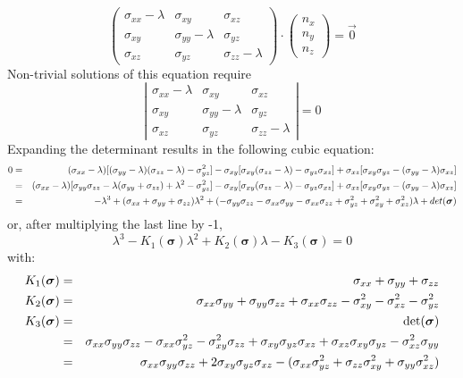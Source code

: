 \[
\left(
\begin{array}{ccc}
\sigma_{xx}-\lambda & \sigma_{xy} & \sigma_{xz} \\
\sigma_{xy} & \sigma_{yy}-\lambda & \sigma_{yz} \\
\sigma_{xz} & \sigma_{yz} & \sigma_{zz} -\lambda
\end{array}
\right)
\cdot
\left(
\begin{array}{c}
n_x \\ n_y \\ n_z
\end{array}
\right)
= \vec{0}
\]
Non-trivial solutions of this equation require 
\[
\left|  
\begin{array}{ccc}
\sigma_{xx}-\lambda & \sigma_{xy} & \sigma_{xz} \\
\sigma_{xy} & \sigma_{yy}-\lambda & \sigma_{yz} \\
\sigma_{xz} & \sigma_{yz} & \sigma_{zz} -\lambda
\end{array}
\right|
=0
\]
Expanding the determinant results in the following cubic equation:
\begin{eqnarray}
0 
&=&
(\sigma_{xx}-\lambda) [ ( \sigma_{yy}-\lambda )( \sigma_{zz} -\lambda)- \sigma_{yz}^2]
- \sigma_{xy} [ \sigma_{xy} ( \sigma_{zz} -\lambda) - \sigma_{yz} \sigma_{xz} ] 
+ \sigma_{xz} [ \sigma_{xy}  \sigma_{yz} - (\sigma_{yy}-\lambda )  \sigma_{xz} ]  \nonumber\\
&=& (\sigma_{xx}-\lambda) [ \sigma_{yy}\sigma_{zz} -\lambda (\sigma_{yy}+ \sigma_{zz})+ \lambda ^2- \sigma_{yz}^2]
- \sigma_{xy} [ \sigma_{xy} ( \sigma_{zz} -\lambda) - \sigma_{yz} \sigma_{xz} ] 
+ \sigma_{xz} [ \sigma_{xy}  \sigma_{yz} - (\sigma_{yy}-\lambda )  \sigma_{xz} ] \nonumber\\
&=& -\lambda^3
+ (\sigma_{xx} + \sigma_{yy} + \sigma_{zz} )\lambda^2
+ (-\sigma_{yy}\sigma_{zz} -\sigma_{xx}\sigma_{yy} -\sigma_{xx}\sigma_{zz} 
  +\sigma_{yz}^2 +\sigma_{xy}^2 + \sigma_{xz}^2 )\lambda
+ det({\bm \sigma}) \nonumber
\end{eqnarray}
or, after multiplying the last line by -1,
\begin{equation}
\lambda^3 - K_1({\bm \sigma}) \lambda^2 + K_2({\bm \sigma}) \lambda -K_3({\bm \sigma})=0
\end{equation}
with:
\begin{eqnarray}
K_1({\bm \sigma}) &=& \sigma_{xx}+\sigma_{yy}+\sigma_{zz}\nonumber\\
K_2({\bm \sigma}) &=& \sigma_{xx}\sigma_{yy}+\sigma_{yy}\sigma_{zz}+\sigma_{xx}\sigma_{zz}
-\sigma_{xy}^2 -\sigma_{xz}^2 -\sigma_{yz}^2 \nonumber\\
K_3({\bm \sigma}) 
&=& \det ({\bm \sigma}) \nonumber\\
&=& \sigma_{xx}\sigma_{yy}\sigma_{zz}-\sigma_{xx}\sigma_{yz}^2
-\sigma_{xy}^2\sigma_{zz}+\sigma_{xy}\sigma_{yz}\sigma_{xz}
+\sigma_{xz}\sigma_{xy}\sigma_{yz}-\sigma_{xz}^2\sigma_{yy} \nonumber\\
&=& \sigma_{xx}\sigma_{yy}\sigma_{zz}
+2\sigma_{xy}\sigma_{yz}\sigma_{xz}
-( \sigma_{xx}\sigma_{yz}^2 +  \sigma_{zz} \sigma_{xy}^2 + \sigma_{yy}\sigma_{xz}^2 )
\end{eqnarray}
